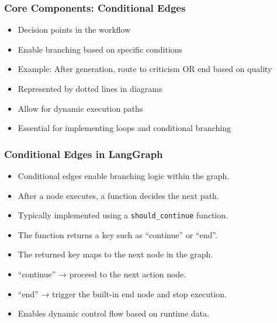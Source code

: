 \begin{frame}[fragile]\frametitle{Core Components: Conditional Edges}
      \begin{itemize}
        \item Decision points in the workflow
        \item Enable branching based on specific conditions
        \item Example: After generation, route to criticism OR end based on quality
        \item Represented by dotted lines in diagrams
        \item Allow for dynamic execution paths
        \item Essential for implementing loops and conditional branching
      \end{itemize}
\end{frame}

\begin{frame}[fragile]\frametitle{Conditional Edges in LangGraph}
      \begin{itemize}
        \item Conditional edges enable branching logic within the graph.
        \item After a node executes, a function decides the next path.
        \item Typically implemented using a \texttt{should\_continue} function.
        \item The function returns a key such as “continue” or “end”.
        \item The returned key maps to the next node in the graph.
        \item “continue” → proceed to the next action node.
        \item “end” → trigger the built-in end node and stop execution.
        \item Enables dynamic control flow based on runtime data.
      \end{itemize}
\end{frame}


